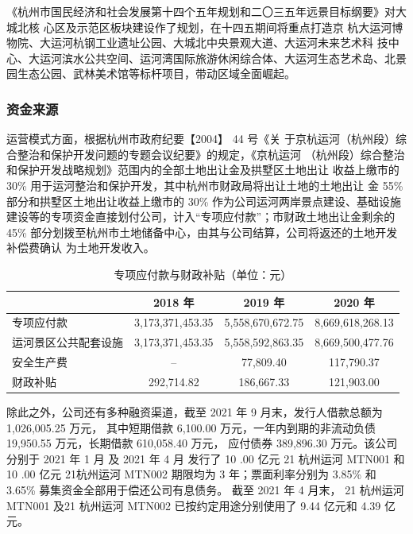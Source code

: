\documentclass[H:\workspace\担保人财务信息2\杭州大运河\HangZhouText.tex]{subfiles}
\begin{document}
《杭州市国民经济和社会发展第十四个五年规划和二〇三五年远景目标纲要》对大城北核
心区及示范区板块建设作了规划，在十四五期间将重点打造京
杭大运河博物院、大运河杭钢工业遗址公园、大城北中央景观大道、大运河未来艺术科
技中心、大运河滨水公共空间、运河湾国际旅游休闲综合体、大运河生态艺术岛、北景
园生态公园、武林美术馆等标杆项目，带动区域全面崛起。\par 

\subsubsection{资金来源}
运营模式方面，根据杭州市政府纪要【2004】 44 号《关
于京杭运河（杭州段）综合整治和保护开发问题的专题会议纪要》的规定，《京杭运河
（杭州段）综合整治和保护开发战略规划》范围内的全部土地出让金及拱墅区土地出让
收益上缴市的 30\% 用于运河整治和保护开发，其中杭州市财政局将出让土地的土地出让
金 55\% 部分和拱墅区土地出让收益上缴市的 30\% 作为公司运河两岸景点建设、基础设施
建设等的专项资金直接划付公司，计入“专项应付款”；市财政土地出让金剩余的 45\%
部分划拨至杭州市土地储备中心，由其与公司结算，公司将返还的土地开发补偿费确认
为土地开发收入。
\begin{table}[H]
    \xiaowuhao 
    \centering 
    \setlength{\tabcolsep}{1.2em} %
    {\renewcommand{\arraystretch}{0.5} %
    \begin{tabular}{@{}l|c|c|c@{}}
        \toprule 
        & 2018 年 & 2019 年 & 2020 年 \\ 
        \midrule 
        专项应付款 & 3,173,371,453.35 & 5,558,670,672.75 & 8,669,618,268.13 \\
        运河景区公共配套设施 & 3,173,371,453.35 & 5,558,592,863.35 & 8,669,500,477.76 \\ 
        安全生产费 & -- & 77,809.40 & 117,790.37 \\
        \addlinespace 
        财政补贴 & 292,714.82 & 186,667.33 & 121,903.00 \\
        \bottomrule 
    \end{tabular}
    }
    \caption{专项应付款与财政补贴（单位：元）}
\end{table}



除此之外，公司还有多种融资渠道，截至 2021 年 9 月末，发行人借款总额为 1,026,005.25 万元，
其中短期借款 6,100.00 万元，一年内到期的非流动负债 19,950.55 万元，长期借款 610,058.40 万元，
应付债券 389,896.30 万元。该公司分别于 2021 年 1 月 及 2021 年 4 月 发行了 10 .00 亿元 21 杭州运河 MTN001 和 10 .00 亿元 
21杭州运河 MTN002 期限均为 3 年；票面利率分别为 3.85\% 和 3.65\% 募集资金全部用于偿还公司有息债务。 
截至 2021 年 4 月末， 21 杭州运河 MTN001 及21 杭州运河 MTN002 已按约定用途分别使用了 9.44 亿元和 4.39 
亿元。
\end{document}
